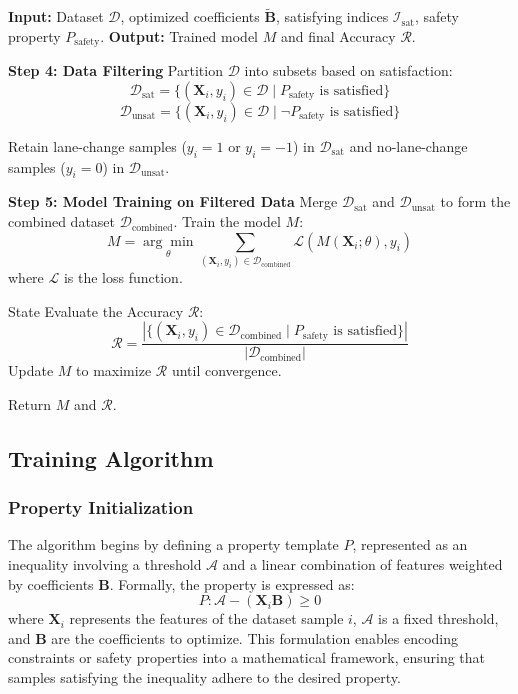 \begin{algorithm}[htbp]
    
    \caption{Property-Based Training with Convex Optimization (Part 2: Filtering and Training)}
    \begin{algorithmic}[1]
    \State \textbf{Input:} Dataset $\mathcal{D}$, optimized coefficients $\tilde{\mathbf{B}}$, satisfying indices $\mathcal{I}_{\text{sat}}$, safety property $P_{\text{safety}}$.
    \State \textbf{Output:} Trained model $M$ and final Accuracy $\mathcal{R}$.
    
    \State \textbf{Step 4: Data Filtering}
    \State Partition $\mathcal{D}$ into subsets based on satisfaction:
    \[
    \mathcal{D}_{\text{sat}} = \{(\mathbf{X}_i, y_i) \in \mathcal{D} \mid P_{\text{safety}} \text{ is satisfied}\}
    \]
    \[
    \mathcal{D}_{\text{unsat}} = \{(\mathbf{X}_i, y_i) \in \mathcal{D} \mid \neg P_{\text{safety}} \text{ is satisfied}\}
    \]
    
    \State Retain lane-change samples ($y_i = 1$ or $y_i = -1$) in $\mathcal{D}_{\text{sat}}$ and no-lane-change samples ($y_i = 0$) in $\mathcal{D}_{\text{unsat}}$.
    
    \State \textbf{Step 5: Model Training on Filtered Data}
    \State Merge $\mathcal{D}_{\text{sat}}$ and $\mathcal{D}_{\text{unsat}}$ to form the combined dataset $\mathcal{D}_{\text{combined}}$.
    \State Train the model $M$:
    \[
    M = \underset{\theta}{\arg\min} \sum_{(\mathbf{X}_i, y_i) \in \mathcal{D}_{\text{combined}}} \mathcal{L}(M(\mathbf{X}_i; \theta), y_i)
    \]
    where $\mathcal{L}$ is the loss function.

    State Evaluate the Accuracy $\mathcal{R}$:
    \[
    \mathcal{R} = \frac{|\{(\mathbf{X}_i, y_i) \in \mathcal{D}_{\text{combined}} \mid P_{\text{safety}} \text{ is satisfied}\}|}{|\mathcal{D}_{\text{combined}}|}
    \]
    \State Update $M$ to maximize $\mathcal{R}$ until convergence.
    
    \State Return $M$ and $\mathcal{R}$.
    \end{algorithmic}
    \label{alg:compositional_training_2}
\end{algorithm}


\subsection{Training Algorithm}
\subsubsection{Property Initialization}
The algorithm begins by defining a property template \( P \), represented as an inequality involving a threshold \( \mathcal{A} \) and a linear combination of features weighted by coefficients \( \mathbf{B} \). Formally, the property is expressed as:
\[
P: \mathcal{A} - (\mathbf{X}_i \mathbf{B}) \geq 0
\]
where \( \mathbf{X}_i \) represents the features of the dataset sample \( i \), \( \mathcal{A} \) is a fixed threshold, and \( \mathbf{B} \) are the coefficients to optimize. This formulation enables encoding constraints or safety properties into a mathematical framework, ensuring that samples satisfying the inequality adhere to the desired property.

